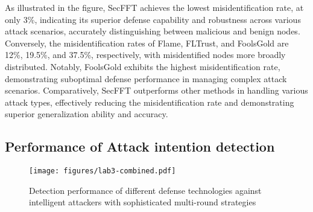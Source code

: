 \documentclass[lettersize,journal]{IEEEtran}
\begin{document}
As illustrated in the figure, SecFFT achieves the lowest misidentification rate, at only 3\%, indicating its superior defense capability and robustness across various attack scenarios, accurately distinguishing between malicious and benign nodes. Conversely, the misidentification rates of Flame, FLTrust, and FoolsGold are 12\%, 19.5\%, and 37.5\%, respectively, with misidentified nodes more broadly distributed. Notably, FoolsGold exhibits the highest misidentification rate, demonstrating suboptimal defense performance in managing complex attack scenarios. Comparatively, SecFFT outperforms other methods in handling various attack types, effectively reducing the misidentification rate and demonstrating superior generalization ability and accuracy.

\vspace{-0.28cm}
\subsection{Performance of Attack intention detection}

\begin{figure*}[!t]
    \centering
    \texttt{[image: figures/lab3-combined.pdf]}
    \caption{Detection performance of different defense technologies against intelligent attackers with sophisticated multi-round strategies}
    \label{fig:lab3}
\end{figure*}
\end{document}
